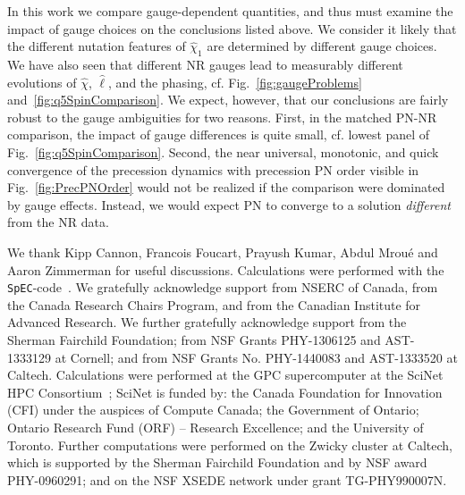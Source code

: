 \documentclass[aps,prd,amsmath,floatfix,twocolumn,superscriptaddress,nofootinbib,showpacs]{revtex4-1}
\begin{document}
In this work we compare gauge-dependent quantities, and thus must
examine the impact of gauge choices on the conclusions listed above.
We consider it likely that the different nutation features of
$\hat\chi_1$ are determined by different gauge choices.  We have also
seen that different NR gauges lead to measurably different evolutions
of $\hat\chi$, $\hat\ell$, and the phasing,
cf. Fig.~\ref{fig:gaugeProblems} and~\ref{fig:q5SpinComparison}.  We
expect, however, that our conclusions are fairly robust to the
gauge ambiguities for two reasons. First, in the matched PN-NR
comparison, the impact of gauge differences is quite small, cf. lowest
panel of Fig.~\ref{fig:q5SpinComparison}.  Second, the near universal,
monotonic, and quick convergence of the precession dynamics with
precession PN order visible in Fig.~\ref{fig:PrecPNOrder} would not be
realized if the comparison were dominated by gauge effects.  Instead,
we would expect PN to converge to a solution {\em different} from the
NR data.

 

\begin{acknowledgments}
  We thank Kipp Cannon, Francois Foucart, Prayush Kumar, Abdul Mrou\'e
  and Aaron Zimmerman for useful discussions.  Calculations were
  performed with the {\tt SpEC}-code~\cite{SpECwebsite}.  We
  gratefully acknowledge support from NSERC of Canada, from the Canada
  Research Chairs Program, and from the Canadian Institute for
  Advanced Research.  We further gratefully acknowledge support from
  the Sherman Fairchild Foundation; from NSF Grants PHY-1306125 and
  AST-1333129 at Cornell; and from NSF Grants No. PHY-1440083 and
  AST-1333520 at Caltech.  Calculations were performed at the GPC
  supercomputer at the SciNet HPC Consortium~\cite{scinet}; SciNet is
  funded by: the Canada Foundation for Innovation (CFI) under the
  auspices of Compute Canada; the Government of Ontario; Ontario
  Research Fund (ORF) -- Research Excellence; and the University of
  Toronto.  Further computations were performed on the Zwicky cluster
  at Caltech, which is supported by the Sherman Fairchild Foundation
  and by NSF award PHY-0960291; and on the NSF XSEDE network under
  grant TG-PHY990007N.%
\end{acknowledgments}



\appendix %
\end{document}
